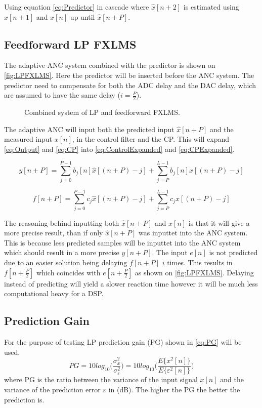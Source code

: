 Using equation \ref{eq:Predictor} in cascade where $\hat{x}[n+2]$ is estimated using $\hat{x}[n+1]$ and $x[n]$ up until $\hat{x}[n+P]$. 

\subsection{Feedforward LP FXLMS}
The adaptive ANC system combined with the predictor is shown on \autoref{fig:LPFXLMS}. Here the predictor will be inserted before the ANC system. The predictor need to compensate for both the ADC delay and the DAC delay, which are assumed to have the same delay ($i=\frac{P}{2}$).   

\begin{figure}[H]
	\centering
	
	\caption{Combined system of LP and feedforward FXLMS.}
	\label{fig:LPFXLMS}
\end{figure}

The adaptive ANC will input both the predicted input $\hat{x}[n+P]$ and the measured input $x[n]$, in the control filter and the CP. This will expand \autoref{eq:Output} and \autoref{eq:CP} into \autoref{eq:ControlExpanded} and \autoref{eq:CPExpanded}.   

\begin{equation}\label{eq:ControlExpanded}
y[n+P]=\sum^{P-1}_{j=0}b_j[n]\hat{x}[(n+P)-j]+\sum^{L-1}_{j=P}b_j[n]x[(n+P)-j]
\end{equation}

\begin{equation}\label{eq:CPExpanded}
f[n+P]=\sum^{P-1}_{j=0}c_j\hat{x}[(n+P)-j]+\sum^{L-1}_{j=P}c_jx[(n+P)-j]
\end{equation}

The reasoning behind inputting both $\hat{x}[n+P]$ and $x[n]$ is that it will give a more precise result, than if only $\hat{x}[n+P]$ was inputtet into the ANC system. This is because less predicted samples will be inputtet into the ANC system which should result in a more precise $y[n+P]$. The input $e[n]$ is not predicted due to an easier solution being delaying $f[n+P]$ $i$ times. This results in $f[n+\frac{P}{2}]$ which coincides with $e[n+\frac{P}{2}]$ as shown on \autoref{fig:LPFXLMS}. Delaying instead of predicting will yield a slower reaction time however it will be much less computational heavy for a DSP.       

\subsection{Prediction Gain}
For the purpose of testing LP prediction gain (PG) shown in \autoref{eq:PG} will be used. 
\begin{equation}\label{eq:PG}
PG = 10 log_{10}\bigg(\frac{\sigma^2_x}{\sigma^2_\varepsilon}\bigg) = 10 log_{10}\bigg(\frac{E\{x^2[n]\}}{E\{\varepsilon^2[n]\}}\bigg)
\end{equation}
where PG is the ratio between the variance of the input signal $x[n]$ and the variance of the prediction error $\varepsilon$ in (dB). The higher the PG the better the prediction is.
